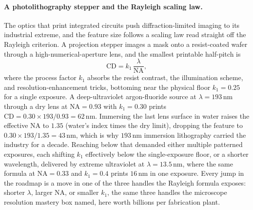 \paragraph{A photolithography stepper and the Rayleigh scaling law.} The optics
that print integrated circuits push diffraction-limited imaging to its
industrial extreme, and the feature size follows a scaling law read straight off
the Rayleigh criterion. A projection stepper images a mask onto a resist-coated
wafer through a high-numerical-aperture lens, and the smallest printable
half-pitch is
\[
\text{CD} = k_1\,\frac{\lambda}{\text{NA}},
\]
where the process factor $k_1$ absorbs the resist contrast, the illumination
scheme, and resolution-enhancement tricks, bottoming near the physical floor
$k_1 = 0.25$ for a single exposure. A deep-ultraviolet argon-fluoride source at
$\lambda = 193\,\si{\nano\meter}$ through a dry lens at $\text{NA} = 0.93$ with
$k_1 = 0.30$ prints $\text{CD} = 0.30\times 193/0.93 = 62\,\si{\nano\meter}$.
Immersing the last lens surface in water raises the effective NA to $1.35$
(water's index times the dry limit), dropping the feature to
$0.30\times 193/1.35 = 43\,\si{\nano\meter}$, which is why $193\,\si{\nano\meter}$
immersion lithography carried the industry for a decade. Reaching below that
demanded either multiple patterned exposures, each shifting $k_1$ effectively
below the single-exposure floor, or a shorter wavelength, delivered by extreme
ultraviolet at $\lambda = 13.5\,\si{\nano\meter}$, where the same formula at
$\text{NA} = 0.33$ and $k_1 = 0.4$ prints $16\,\si{\nano\meter}$ in one
exposure. Every jump in the roadmap is a move in one of the three handles the
Rayleigh formula exposes: shorter $\lambda$, larger NA, or smaller $k_1$, the
same three handles the microscope resolution mastery box named, here worth
billions per fabrication plant.

